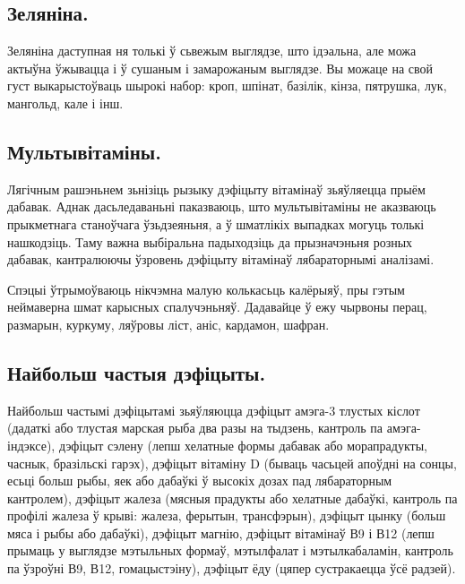 \subsection{Зеляніна.}
Зеляніна даступная ня толькі ў сьвежым выглядзе, што ідэальна, але можа актыўна ўжывацца і ў сушаным і замарожаным выглядзе. Вы можаце на свой густ выкарыстоўваць шырокі набор: кроп, шпінат, базілік, кінза, пятрушка, лук, мангольд, кале і інш.

\subsection{Мультывітаміны.}
Лягічным рашэньнем зьнізіць рызыку дэфіцыту вітамінаў зьяўляецца прыём дабавак. Аднак дасьледаваньні паказваюць, што мультывітаміны не аказваюць прыкметнага станоўчага ўзьдзеяньня, а ў шматлікіх выпадках могуць толькі нашкодзіць. Таму важна выбіральна падыходзіць да прызначэньня розных дабавак, кантралюючы ўзровень дэфіцыту вітамінаў лябараторнымі аналізамі.

Спэцыі ўтрымоўваюць нікчэмна малую колькасьць калёрыяў, пры гэтым неймаверна шмат карысных спалучэньняў. Дадавайце ў ежу чырвоны перац, размарын, куркуму, ляўровы ліст, аніс, кардамон, шафран.

\subsection{Найбольш частыя дэфіцыты.}
Найбольш частымі дэфіцытамі зьяўляюцца дэфіцыт амэга-3 тлустых кіслот (дадаткі або тлустая марская рыба два разы на тыдзень, кантроль па амэга-індэксе), дэфіцыт сэлену (лепш хелатные формы дабавак або морапрадукты, часнык, бразільскі гарэх), дэфіцыт вітаміну D (бываць часьцей апоўдні на сонцы, есьці больш рыбы, яек або дабаўкі ў высокіх дозах пад лябараторным кантролем), дэфіцыт жалеза (мясныя прадукты або хелатные дабаўкі, кантроль па профілі жалеза ў крыві: жалеза, ферытын, трансфэрын), дэфіцыт цынку (больш мяса і рыбы або дабаўкі), дэфіцыт магнію, дэфіцыт вітамінаў В9 і В12 (лепш прымаць у выглядзе мэтыльных формаў, мэтылфалат і мэтылкабаламін, кантроль па ўзроўні В9, В12, гомацыстэіну), дэфіцыт ёду (цяпер сустракаецца ўсё радзей).
